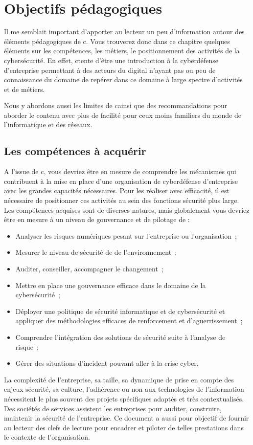 
\section{Objectifs pédagogiques}
Il me semblait important d'apporter au lecteur un peu d'information autour des éléments pédagogiques de c\ecours. Vous trouverez donc dans ce chapitre quelques éléments sur les compétences, les métiers, le positionnement des activités de la cybersécurité.
En effet, c\ecours tente d'être une introduction à la cyberdéfense d'entreprise permettant à des acteurs du digital n'ayant pas ou peu de connaissance du domaine de repérer dans ce domaine à large spectre d'activités et de métiers.

Nous y abordons aussi les limites de c\ecours ainsi que des recommandations pour aborder le contenu avec plus de facilité pour ceux moins familiers du monde de l'informatique et des réseaux.

\subsection{Les compétences à acquérir}
A l'issue de c\ecours, vous devriez être en mesure de comprendre les mécanismes qui contribuent à la mise en place d'une organisation de cyberdéfense d'entreprise avec les grandes capacités nécessaires.  Pour les réaliser avec efficacité, il est nécessaire de positionner ces activités au sein des fonctions sécurité plus large. Les compétences acquises sont de diverses natures, mais globalement vous devriez être en mesure à un niveau de gouvernance et de pilotage de :  

\begin{itemize}
	\item Analyser les risques numériques pesant sur l'entreprise ou l'organisation ;
	\item Mesurer le niveau de sécurité de de l'environnement ;
	\item Auditer, conseiller, accompagner le changement ;
	\item Mettre en place une gouvernance efficace dans le domaine de la cybersécurité ;
	\item Déployer une politique de sécurité informatique et de cybersécurité et appliquer des méthodologies efficaces de renforcement et d'aguerrissement ;
	\item Comprendre l'intégration des solutions de sécurité suite à l'analyse de risque ;
	\item Gérer des situations d'incident pouvant aller à la crise cyber.
\end{itemize}
La complexité de l'entreprise, sa taille, sa dynamique de prise en compte des enjeux sécurité, sa culture, l'adhérence ou non aux technologies de l'information nécessitent le plus souvent des projets spécifiques adaptés et très contextualisés. Des sociétés de services assistent les entreprises pour auditer, construire, maintenir la sécurité de l'entreprise. Ce document a aussi pour objectif de fournir au lecteur des clefs de lecture pour encadrer et piloter de telles prestations dans le contexte de l'organisation. 


